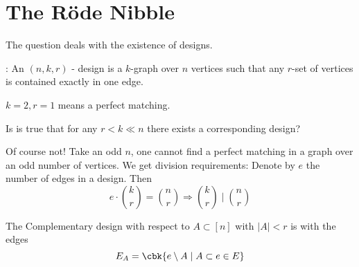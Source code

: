 \documentclass[a4paper, 11pt, oneside]{book}
\begin{document}
\section{The R\"{o}de Nibble}
The question deals with the existence of designs.
\begin{yellowBox}
\begin{defn}
	[$(n,k,r)$ - design]: An $(n,k,r)$ - design is a $k$-graph over $n$ vertices such that any $r$-set of vertices is contained exactly in one edge. 
\end{defn}	
\end{yellowBox}
\begin{example}
	$k=2, r=1$ means a perfect matching. 
\end{example}
\begin{question}
	Is is true that for any $r < k \ll n$ there exists a corresponding design?
\end{question}
Of course not! Take an odd $n$, one cannot find a perfect matching in a graph over an odd number of vertices. We get division requirements: Denote by $e$ the number of edges in a design. Then
\[
e\cdot{k\choose r} = {n\choose r} \Rightarrow {k\choose r}\mid {n\choose r}
\]

\begin{yellowBox}
\begin{defn}
	The Complementary design with respect to $A\subset [n]$ with $|A| < r$ is with the edges
	\[
	E_A = \cbk{e\setminus A\mid A\subset e \in E}
	\]
\end{defn}
\end{yellowBox}
\end{document}
